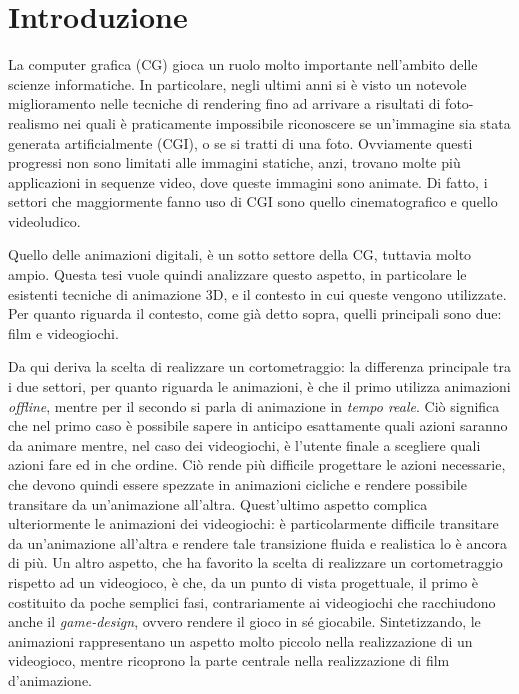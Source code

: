 
\chapter{Introduzione} %

\label{Chapter1} %


La computer grafica (CG) gioca un ruolo molto importante nell'ambito delle scienze informatiche.
In particolare, negli ultimi anni si è visto un notevole miglioramento nelle tecniche di rendering fino ad arrivare a risultati di foto-realismo nei quali è praticamente impossibile riconoscere se un'immagine sia stata generata artificialmente (CGI), o se si tratti di una foto.
Ovviamente questi progressi non sono limitati alle immagini statiche, anzi, trovano molte più applicazioni in sequenze video, dove queste immagini sono animate. 
Di fatto, i settori che maggiormente fanno uso di CGI sono quello cinematografico e quello videoludico.

Quello delle animazioni digitali, è un sotto settore della CG, tuttavia molto ampio. Questa tesi vuole quindi analizzare questo aspetto, in particolare le esistenti tecniche di animazione 3D, e il contesto in cui queste vengono utilizzate. Per quanto riguarda il contesto, come già detto sopra, quelli principali sono due: film e videogiochi.

Da qui deriva la scelta di realizzare un cortometraggio: la differenza principale tra i due settori, per quanto riguarda le animazioni, è che il primo utilizza animazioni \emph{offline}, mentre per il secondo si parla di animazione in \emph{tempo reale}.
Ciò significa che nel primo caso è possibile sapere in anticipo esattamente quali azioni saranno da animare mentre, nel caso dei videogiochi, è l'utente finale a scegliere quali azioni fare ed in che ordine. Ciò rende più difficile progettare le azioni necessarie, che devono quindi essere spezzate in animazioni cicliche e rendere possibile transitare da un'animazione all'altra. Quest'ultimo aspetto complica ulteriormente le animazioni dei videogiochi: è particolarmente difficile transitare da un'animazione all'altra e rendere tale transizione fluida e realistica lo è ancora di più.
Un altro aspetto, che ha favorito la scelta di realizzare un cortometraggio rispetto ad un videogioco, è che, da un punto di vista progettuale, il primo è costituito da poche semplici fasi, contrariamente ai videogiochi che racchiudono anche il \emph{game-design}, ovvero rendere il gioco in sé giocabile. Sintetizzando, le animazioni rappresentano un aspetto molto piccolo nella realizzazione di un videogioco, mentre ricoprono la parte centrale nella realizzazione di film d'animazione.

